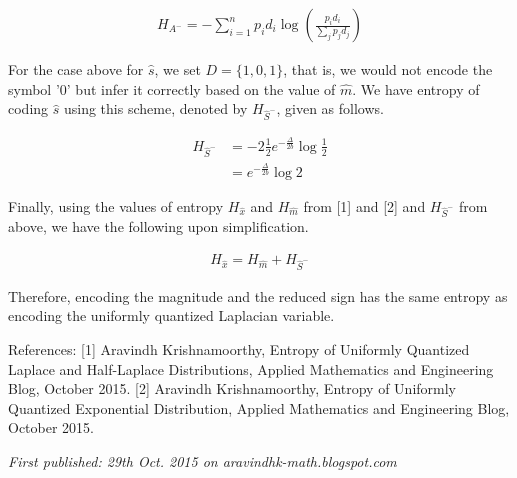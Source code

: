 \begin{align}H_{A^{-}} = -\sum_{i = 1}^{n} p_i d_i \log \left( \frac{p_i d_i}{\sum_{j} p_j d_j} \right)\end{align}

For the case above for $\hat{s}$, we set $D = \{1, 0, 1\}$, that is, we would not encode the symbol '0' but infer it correctly based on the value of $\hat{m}$. We have entropy of coding $\hat{s}$ using this scheme, denoted by $H_{\hat{S}^-}$, given as follows.

\begin{align}H_{\hat{S}^-} &= -2\frac{1}{2} e^{-\frac{\Delta}{2b}} \log \frac{1}{2}\nonumber\\ &= e^{-\frac{\Delta}{2b}} \log 2\end{align}

Finally, using the values of entropy $H_{\hat{x}}$ and $H_{\hat{m}}$ from [1] and [2] and $H_{\hat{S}^-}$ from above, we have the following upon simplification.

\begin{align}H_{\hat{x}} = H_{\hat{m}} + H_{\hat{S}^-}\end{align}

Therefore, encoding the magnitude and the reduced sign has the same entropy as encoding the uniformly quantized Laplacian variable.

References:
[1] Aravindh Krishnamoorthy, Entropy of Uniformly Quantized Laplace and Half-Laplace Distributions, Applied Mathematics and Engineering Blog, October 2015.
[2] Aravindh Krishnamoorthy, Entropy of Uniformly Quantized Exponential Distribution, Applied Mathematics and Engineering Blog, October 2015.

\emph{First published: 29th Oct. 2015 on aravindhk-math.blogspot.com}
